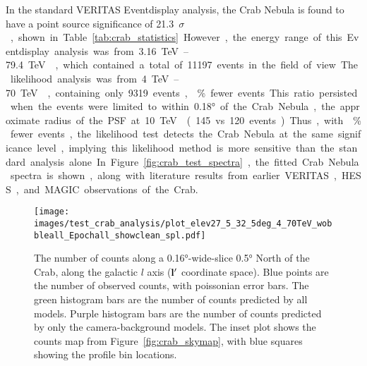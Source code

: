   In the standard VERITAS Eventdisplay analysis, the Crab Nebula is found to have a point source significance of \SI{21.3}{$\sigma$}, shown in Table~\ref{tab:crab_statistics}.
  However, the energy range of this Eventdisplay analysis was from \SIrange{3.16}{79.4}{\TeV{}}, which contained a total of 11197 events in the field of view.
  The likelihood analysis was from \SIrange{4}{70}{\TeV{}}, containing only 9319 events, \% fewer events.
  This ratio persisted when the events were limited to within \ang{0.18} of the Crab Nebula, the approximate radius of the PSF at \SI{10}{\TeV{}} (145 vs 120 events).
  Thus, with \% fewer events, the likelihood test detects the Crab Nebula at the same significance level, implying this likelihood method is more sensitive than the standard analysis alone.
  In Figure~\ref{fig:crab_test_spectra}, the fitted Crab Nebula spectra is shown, along with literature results from earlier VERITAS, HESS, and MAGIC observations of the Crab.
  
  \begin{figure}[h]
    \centering
    \texttt{[image: images/test\_crab\_analysis/plot\_elev27\_5\_32\_5deg\_4\_70TeV\_wobbleall\_Epochall\_showclean\_spl.pdf]}
    \caption[Crab Profile along Galactic $l$]
    {
      The number of counts along a \ang{0.16}-wide-slice \ang{0.5} North of the Crab, along the galactic $l$ axis ($\mathbf{l'}$ coordinate space).
      Blue points are the number of observed counts, with poissonian error bars.
      The green histogram bars are the number of counts predicted by all models.
      Purple histogram bars are the number of counts predicted by only the camera-background models.
      The inset plot shows the counts map from Figure~\ref{fig:crab_skymap}, with blue squares showing the profile bin locations.
    }
    \label{fig:crab_profile_l}
  \end{figure}

